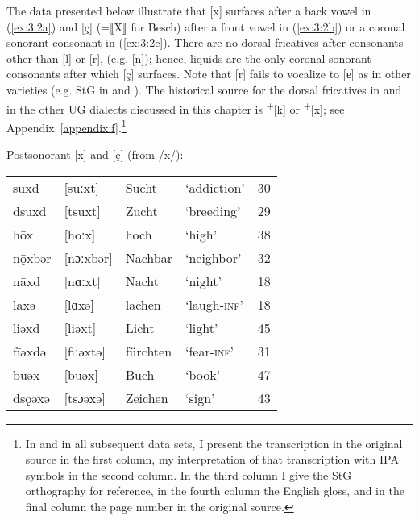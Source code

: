 The data presented below illustrate that [x] surfaces after a back vowel in (\ref{ex:3:2a}) and [ç] (=⟦X⟧ for Besch) after a front vowel in (\ref{ex:3:2b}) or a coronal sonorant consonant in (\ref{ex:3:2c}). There are no dorsal fricatives after consonants other than [l] or [r], (e.g. [n]); hence, liquids are the only coronal sonorant consonants after which [ç] surfaces. Note that [r] fails to vocalize to [ɐ] as in other varieties (e.g. StG in  and ). The historical source for the dorsal fricatives in  and in the other UG dialects discussed in this chapter is  \textsuperscript{+}[k] or \textsuperscript{+}[x]; see Appendix~\ref{appendix:f}.\footnote{{In  and in all subsequent data sets, I present the transcription in the original source in the first column, my interpretation of that transcription with IPA symbols in the second column. In the third column I give the StG orthography for reference, in the fourth column the English gloss, and in the final column the page number in the original source.}}

\ea Postsonorant [x] and [ç] (from /x/):\label{ex:3:2}

\ea\begin{tabular}[t]{@{}p{1.2cm}p{1.5cm}p{2.2cm}p{3.2cm}r}
    sūxd   & [suːxt]   & Sucht    & ‘addiction’          & 30\\
    dsuxd  & [tsuxt]   & Zucht    & ‘breeding’           & 29\\
    hōx    & [hoːx]    & hoch     & ‘high’               & 38\\
    nǭxbər & [nɔːxbər] & Nachbar  & ‘neighbor’           & 32\\
    nāxd   & [nɑːxt]   & Nacht    & ‘night’              & 18\\
    laxə   & [lɑxə]    & lachen   & ‘laugh-\textsc{inf}’ & 18\\
    liəxd  & [liəxt]   & Licht    & ‘light’              & 45\\
    fīəxdə & [fiːəxtə] & fürchten & ‘fear-\textsc{inf}’  & 31\\
    buəx   & [buəx]    & Buch     & ‘book’               & 47\\
    dsǫəxə & [tsɔəxə]  & Zeichen  & ‘sign’               & 43
    \end{tabular}\label{ex:3:2a}

